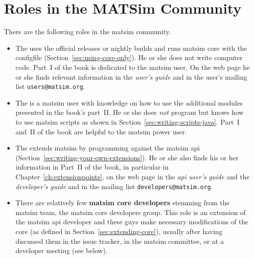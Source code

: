\section{Roles in the MATSim Community}
\label{sec:roles}
There are the following roles in the \gls{matsim} community.
%
\begin{itemize}\styleItemize
\item The  uses the official releases or nightly builds and runs \gls{matsim} core with the \gls{configfile} (Section~\ref{sec:using-core-only}). He or she does not write computer code. Part~I of the book is dedicated to the \gls{matsim} user. On the web page he or she finds relevant information in the \emph{user's guide} and in the user's mailing list \lstinline|users@matsim.org|.
%
\item The  is a \gls{matsim} user with knowledge on how to use the additional modules presented in the book's part~II. He or she does \emph{not} program but knows how to use \gls{matsim} scripts as shown in Section~\ref{sec:writing-scripts-java}. Part~I and~II of the book are helpful to the \gls{matsim} power user.
%
\item The  extends \gls{matsim} by programming against the \gls{matsim} \gls{api} (Section~\ref{sec:writing-your-own-extensions}). He or she also finds his or her information in Part~II of the book, in particular in Chapter~\ref{ch:extensionpoints}, on the web page in the \emph{\gls{api} user's guide} and the \emph{developer's guide} and in the mailing list \lstinline|developers@matsim.org|.
%
%
\item There are relatively few \textbf{\gls{matsim} core developers} stemming from the \gls{matsim} team, \ie the \gls{matsim} core developers group. This role is an extension of the \gls{matsim} \gls{api} developer and these guys make necessary modifications of the core (as defined in Section~\ref{sec:extending-core}), usually after having discussed them in the issue tracker, in the \gls{matsim} committee, or at a developer meeting (see below). 
%
\end{itemize}
%
